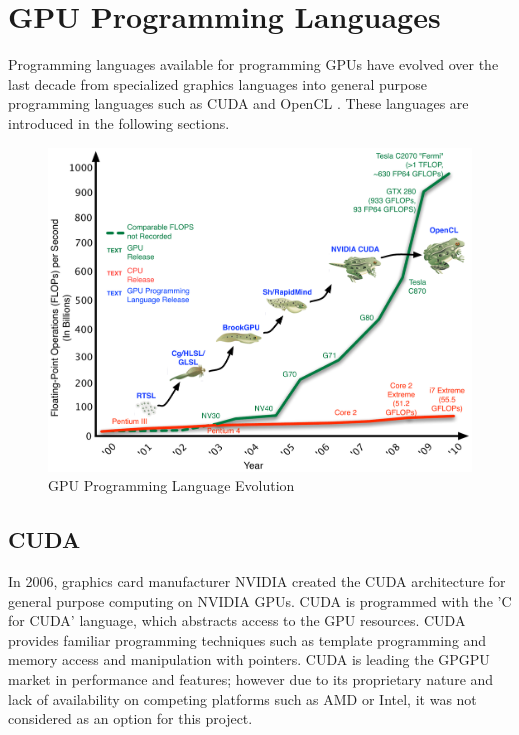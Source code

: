 \section{GPU Programming Languages}

Programming languages available for programming GPUs have evolved over the last
decade from specialized graphics languages into general purpose programming
languages such as CUDA and OpenCL \cite{Owens2007}. These languages are
introduced in the following sections.

\begin{figure}[!htc]
 		\centering
		\includegraphics[scale=.55]{figures/GPU_Evolution_opencl.pdf}
        \caption{ GPU Programming Language Evolution \cite{Bollig2009} }
        \label{fig:frogs}
\end{figure}



\subsection{CUDA}
In 2006, graphics card manufacturer NVIDIA created the CUDA architecture 
for general purpose computing on NVIDIA GPUs. CUDA is programmed with the 'C
for CUDA' language, which abstracts access to the GPU resources. CUDA provides
familiar programming techniques such as template programming and memory access
and manipulation with pointers. CUDA is leading the GPGPU market in performance
and features; however due to its proprietary nature and lack of availability on
competing platforms such as AMD or Intel, it was not considered as an option for
this project.


